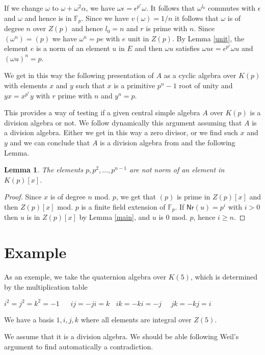 \documentclass[10pt,a4paper]{article}
\newtheorem{lemma}{Lemma}[section]
\newcommand{\FF}{\mathbb{F}}
\newcommand\Nm{\mathsf{Nr}}
\begin{document}
 If we change $\omega$ to $\omega + \omega^2\alpha$, we have $\omega \epsilon = \epsilon^{p^r}\omega$.
 It follows that $\omega^{l_0}$ commutes with $\epsilon$ and $\omega$ and hence is in $\FF_p$.
 Since we have $v(\omega) = 1/n$ it follows that $\omega$ is of degree $n$ over $Z(p)$ and hence $l_0 = n$
 and $r$ is prime with $n$. Since $(\omega^n) = (p)$ we have $\omega^n = p e$ with $e$ unit in $Z(p)$.
 By Lemma \ref{unit}, the element $e$ is a norm of an element $u$ in $E$ and then $\omega u$
 satisfies $\omega u \epsilon = \epsilon^{p^r}\omega u$ and $(\omega u)^n = p$.

 We get in this way the following presentation of $A$ as a cyclic algebra over $K(p)$ with
 elements $x$ and $y$ such that $x$ is a primitive $p^n-1$ root of unity and
 $yx = x^{p^r}y$ with $r$ prime with $n$ and $y^n = p$.
 
 This provides a way of testing if a given central simple algebra $A$ over $K(p)$ is a division algebra or not.
 We follow dynamically this argument assuming that $A$ is a division algebra. Either we get in this way
 a zero divisor, or we find such $x$ and $y$ and we can conclude that $A$ is a division algebra
 from \cite{Wedderburn} and the following Lemma.

 \begin{lemma} 
   The elements $p,p^2,\dots,p^{n-1}$ are not norm of an element in $K(p)[x]$.
 \end{lemma}

 \begin{proof}
   Since $x$ is of degree $n$ mod. $p$, we get that $(p)$ is prime in $Z(p)[x]$ and then $Z(p)[x]$
   mod. $p$ is a finite field extension of $\FF_p$. If $\Nm(u) = p^i$ with $i>0$ then $u$ is in
   $Z(p)[x]$ by Lemma \ref{main}, and $u$ is $0$ mod. $p$, hence $i\geqslant n$.
 \end{proof}
 
 \section{Example}

 As an exemple, we take the quaternion algebra over $K(5)$, which is determined by the multiplication table
 \begin{center}
   $i^2 = j^2 = k^2 = -1~~~~~~~ij = -ji = k~~~~ik = -ki = -j~~~~~~jk = -kj = i$
 \end{center}
 We have a basis $1,i,j,k$ where all elements are integral over $Z(5)$.

 We assume that it is a division algebra. We should be able following Weil's argument to find
 automatically a contradiction.
\end{document}

